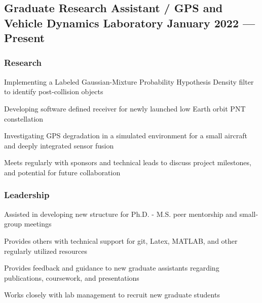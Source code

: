 \documentclass{article}
\begin{document}
\subsection{{Graduate Research Assistant / GPS and Vehicle Dynamics Laboratory \hfill January 2022 --- Present}}
\vspace{-0.2cm}
\subsubsection*{Research}
\vspace{-0.2cm}
\begin{zitemize}
    \item Implementing a Labeled Gaussian-Mixture Probability Hypothesis Density filter to identify post-collision objects
    \item Developing software defined receiver for newly launched low Earth orbit PNT constellation
    \item Investigating GPS degradation in a simulated environment for a small aircraft and deeply integrated sensor fusion
    \item Meets regularly with sponsors and technical leads to discuss project milestones, and potential for future collaboration
\end{zitemize}
\vspace{-0.6cm}
\subsubsection*{Leadership}
\vspace{-0.2cm}
\begin{zitemize}
    \item Assisted in developing new structure for Ph.D. - M.S. peer mentorship and small-group meetings
    \item Provides others with technical support for git, Latex, MATLAB, and other regularly utilized resources
    \item Provides feedback and guidance to new graduate assistants regarding publications, coursework, and presentations
    \item Works closely with lab management to recruit new graduate students 
\end{zitemize}
\end{document}
